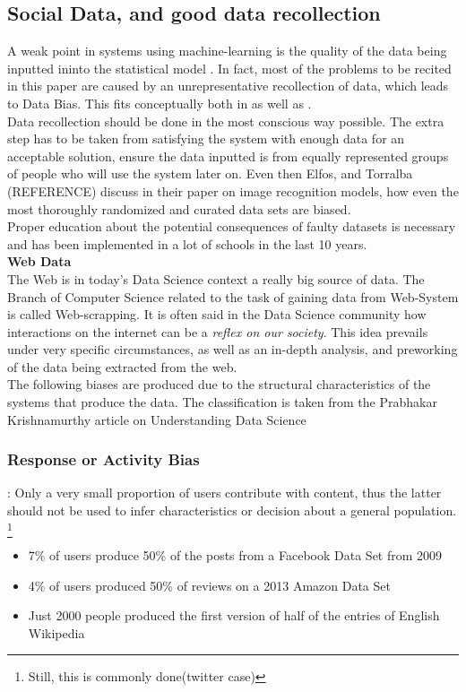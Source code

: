 \subsection{Social Data, and good data recollection} %
A weak point in systems using machine-learning is the quality of the data being inputted ininto the statistical model \cite{Harv18}. In fact, most of the problems to be recited in this paper are caused by an unrepresentative recollection of data, which leads to Data Bias. This fits conceptually both in  as well as .\\
Data recollection should be done in the most conscious way possible. The extra step has to be taken from satisfying the system with enough data for an acceptable solution, ensure the data inputted is from equally represented groups of people who will use the system later on. Even then Elfos, and Torralba (REFERENCE) discuss in their paper on image recognition models, how even the most thoroughly randomized and curated data sets are biased.\\
Proper education about the potential consequences of faulty datasets is necessary and has been implemented in a lot of schools in the last 10 years\cite{MMS*19}\cite{HWD*19}.\\



\textbf{Web Data}\\
The Web is in today's Data Science context a really big source of data. The Branch of Computer Science related to the task of gaining data from Web-System is called Web-scrapping. It is often said in the Data Science community how interactions on the internet can be a \textsl{reflex on our society}. This idea prevails under very specific circumstances, as well as an in-depth analysis, and preworking of the data being extracted from the web.\\
The following biases are produced due to the structural characteristics of the systems that produce the data. The classification is taken from the Prabhakar Krishnamurthy article on Understanding Data Science \cite{Kris19}
\\
\subsubsection{Response or Activity Bias}:
Only a very small proportion of users contribute with content, thus the latter should not be used to infer characteristics or decision about a general population. \footnote{Still, this is commonly done(twitter case)}
\begin{itemize}
  \item 7\% of users produce 50\% of the posts from a Facebook Data Set from 2009
  \item 4\% of users produced 50\% of reviews on a 2013 Amazon Data Set
  \item Just 2000 people produced the first version of half of the entries of English Wikipedia\cite{Baez18}

\end{itemize}

